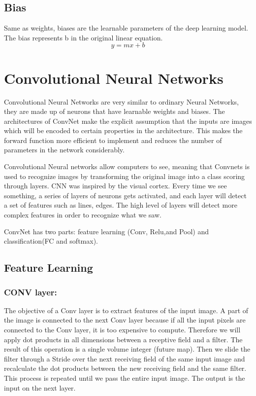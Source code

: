 \documentclass[12pt]{report}
\begin{document}
\subsection{Bias}
Same as weights, biases are the learnable parameters of the deep learning model.
The bias represents b in the original linear equation.
$$ y = mx + b $$

\section{Convolutional Neural Networks}
Convolutional Neural Networks are very similar to ordinary Neural Networks, 
they are made up of neurons that have learnable weights and biases.
The architectures of ConvNet make the explicit assumption that 
the inputs are images which will be encoded to certain properties in the architecture. 
This makes the forward function more efficient to implement and reduces the number of 
parameters in the network considerably.

Convolutional Neural networks allow computers to see, 
meaning that Convnets is used to recognize images by 
transforming the original image into a class scoring through layers.
CNN was inspired by the visual cortex.
Every time we see something, a series of layers of neurons gets activated, 
and each layer will detect a set of features such as lines, edges. 
The high level of layers will detect more complex features in order to recognize what we saw.

ConvNet has two parts: feature learning (Conv, Relu,and Pool) and classification(FC and softmax).

\subsection{Feature Learning}
    \subsubsection{CONV layer:}
        The objective of a Conv layer is to extract features of the input image.
        A part of the image is connected to the next Conv layer because if all the 
        input pixels are connected to the Conv layer, it is too expensive to compute. 
        Therefore we will apply dot products in all dimensions between a receptive 
        field and a filter. The result of this operation is a single volume integer (future map).
        Then we slide the filter through a Stride over the next receiving field of the same input 
        image and recalculate the dot products between the new receiving field and the same filter.
        This process is repeated until we pass the entire input image. The output is the input on the next layer.
\end{document}
